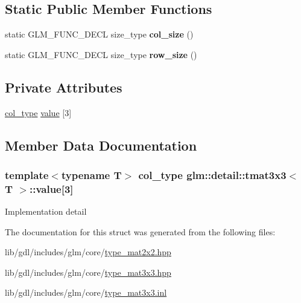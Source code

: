\subsection*{Static Public Member Functions}
\begin{DoxyCompactItemize}
\item 
\hypertarget{structglm_1_1detail_1_1tmat3x3_adad00b6048cfb901455278d9d4576945}{}static G\+L\+M\+\_\+\+F\+U\+N\+C\+\_\+\+D\+E\+C\+L size\+\_\+type {\bfseries col\+\_\+size} ()\label{structglm_1_1detail_1_1tmat3x3_adad00b6048cfb901455278d9d4576945}

\item 
\hypertarget{structglm_1_1detail_1_1tmat3x3_ae33289a56bcabdb12eebac93ebebf5f3}{}static G\+L\+M\+\_\+\+F\+U\+N\+C\+\_\+\+D\+E\+C\+L size\+\_\+type {\bfseries row\+\_\+size} ()\label{structglm_1_1detail_1_1tmat3x3_ae33289a56bcabdb12eebac93ebebf5f3}

\end{DoxyCompactItemize}
\subsection*{Private Attributes}
\begin{DoxyCompactItemize}
\item 
\hyperlink{structglm_1_1detail_1_1tvec3}{col\+\_\+type} \hyperlink{structglm_1_1detail_1_1tmat3x3_ae5015c2f1df4465cd927cf6fc778040c}{value} \mbox{[}3\mbox{]}
\end{DoxyCompactItemize}


\subsection{Member Data Documentation}
\hypertarget{structglm_1_1detail_1_1tmat3x3_ae5015c2f1df4465cd927cf6fc778040c}{}
\subsubsection[{value}]{\setlength{\rightskip}{0pt plus 5cm}template$<$typename T$>$ {\bf col\+\_\+type} {\bf glm\+::detail\+::tmat3x3}$<$ T $>$\+::value\mbox{[}3\mbox{]}\hspace{0.3cm}{\ttfamily [private]}}\label{structglm_1_1detail_1_1tmat3x3_ae5015c2f1df4465cd927cf6fc778040c}
Implementation detail 

The documentation for this struct was generated from the following files\+:\begin{DoxyCompactItemize}
\item 
lib/gdl/includes/glm/core/\hyperlink{type__mat2x2_8hpp}{type\+\_\+mat2x2.\+hpp}\item 
lib/gdl/includes/glm/core/\hyperlink{type__mat3x3_8hpp}{type\+\_\+mat3x3.\+hpp}\item 
lib/gdl/includes/glm/core/\hyperlink{type__mat3x3_8inl}{type\+\_\+mat3x3.\+inl}\end{DoxyCompactItemize}
